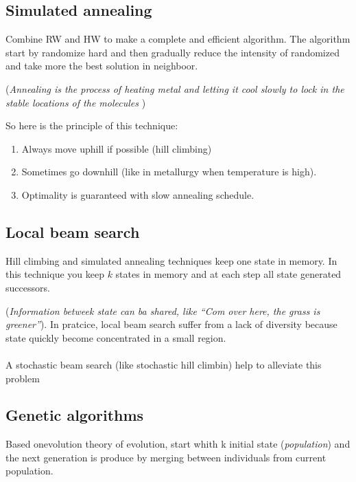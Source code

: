 \subsection{Simulated annealing}
Combine RW and HW to make a complete and efficient algorithm.
The algorithm start by randomize hard and then gradually reduce the intensity of randomized
and take more the best solution in neighboor.

(\textit{Annealing is the process of heating metal and letting it cool slowly to lock in the stable locations of the molecules} )

So here is the principle of this technique:
\begin{enumerate}
	\item Always move uphill if possible (hill climbing)
	\item Sometimes go downhill (like in metallurgy when temperature is high).
	\item Optimality is guaranteed with slow annealing schedule. 
\end{enumerate}


\subsection{Local beam search}

Hill climbing and simulated annealing techniques keep one state in memory. 
In this technique you keep $k$ states in memory and at each step all state 
generated successors. 

(\textit{Information betweek state can ba shared, like
``Com over here, the grass is greener''}).
In pratcice, local beam search suffer from a lack of diversity because
state quickly become concentrated in a small region.


\paragraph{ } A stochastic beam search (like stochastic hill climbin)
help to alleviate this problem


\subsection{Genetic algorithms}  

Based  onevolution theory  of  evolution, start  whith  k initial  state
(\textit{population})  and the  next  generation is  produce by  merging
between individuals from current population. 

